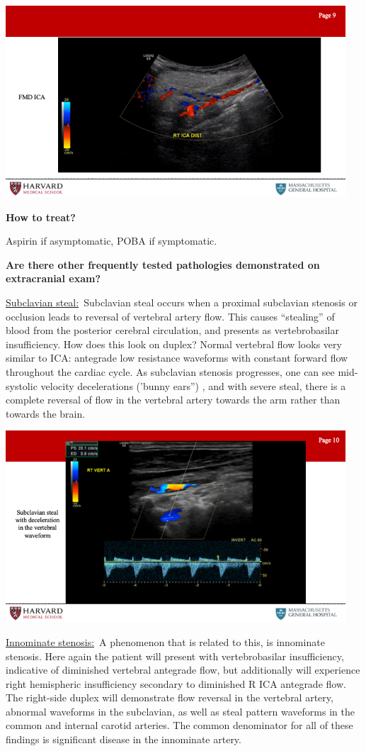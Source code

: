 \documentclass[
]{book}
\begin{document}
\includegraphics[width=5in]{images/vasc_lab/Slide10}

\textbf{How to treat?}

Aspirin if asymptomatic, POBA if symptomatic.

\textbf{Are there other frequently tested pathologies demonstrated on
extracranial exam?}

\underline{Subclavian steal:}~Subclavian steal occurs when a proximal
subclavian stenosis or occlusion leads to reversal of vertebral artery
flow. This causes ``stealing'' of~ blood from the posterior cerebral
circulation, and presents as vertebrobasilar insufficiency. How does
this look on duplex? Normal vertebral flow looks very similar to ICA:
antegrade low resistance waveforms with constant forward flow throughout
the cardiac cycle. As subclavian stenosis progresses, one can see
mid-systolic velocity decelerations ('bunny ears'') , and with severe
steal, there is a complete reversal of flow in the vertebral artery
towards the arm rather than towards the brain.

\includegraphics[width=5in]{images/vasc_lab/Slide11}

\underline{Innominate stenosis:}~A phenomenon that is related to this, is
innominate stenosis. Here again the patient will present with
vertebrobasilar insufficiency, indicative of diminished vertebral
antegrade flow, but additionally will experience right hemispheric
insufficiency secondary to diminished R ICA antegrade flow. The
right-side duplex will demonstrate flow reversal in the vertebral
artery, abnormal waveforms in the subclavian, as well as steal pattern
waveforms in the common and internal carotid arteries. The common
denominator for all of these findings is significant disease in the
innominate artery.
\end{document}
